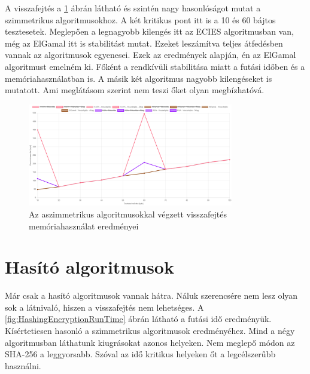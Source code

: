 \documentclass[12pt]{report} %
\begin{document}
A visszafejtés a \ref{fig:AsymmetricDecryptionMemoryUsage} ábrán látható és szintén nagy hasonlóságot mutat a szimmetrikus algoritmusokhoz. A két kritikus pont itt is a 10 és 60 bájtos tesztesetek. Meglepően a legnagyobb kilengés itt az ECIES algoritmusban van, még az ElGamal itt is stabilitást mutat. Ezeket leszámítva teljes átfedésben vannak az algoritmusok egyenesei. Ezek az eredmények alapján, én az ElGamal algoritmust emelném ki. Főként a rendkívüli stabilitása miatt a futási időben és a memóriahasználatban is. A másik két algoritmus nagyobb kilengéseket is mutatott. Ami meglátásom szerint nem teszi őket olyan megbízhatóvá.

\begin{figure}[H]
    \centering %
    \includegraphics[width=0.8\textwidth]{Figures/AsymmetricDecryptionMemoryUsage.png} %
    \caption{Az aszimmetrikus algoritmusokkal végzett visszafejtés memóriahasználat eredményei} %
    \label{fig:AsymmetricDecryptionMemoryUsage} %
\end{figure}

\section{Hasító algoritmusok} %

Már csak a hasító algoritmusok vannak hátra. Náluk szerencsére nem lesz olyan sok a látnivaló, hiszen a visszafejtés nem lehetséges. A \ref{fig:HashingEncryptionRunTime} ábrán látható a futási idő eredményük. Kísértetiesen hasonló a szimmetrikus algoritmusok eredményéhez. Mind a négy algoritmusban láthatunk kiugrásokat azonos helyeken. Nem meglepő módon az SHA-256 a leggyorsabb. Szóval az idő kritikus helyeken őt a legcélszerűbb használni.
\end{document}

